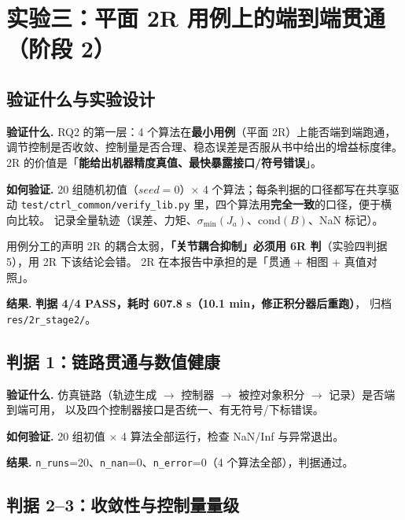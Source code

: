 \documentclass[11pt,a4paper]{ctexart}
\begin{document}
\section{实验三：平面 2R 用例上的端到端贯通（阶段 2）}\label{sec:exp3}

\subsection{验证什么与实验设计}

\textbf{验证什么.} RQ2 的第一层：4 个算法在\textbf{最小用例}（平面 2R）上能否端到端跑通，
调节控制是否收敛、控制量是否合理、稳态误差是否服从书中给出的增益标度律。
2R 的价值是「\textbf{能给出机器精度真值、最快暴露接口/符号错误}」。

\textbf{如何验证.} 20 组随机初值（$seed=0$）$\times$ 4 个算法；每条判据的口径都写在共享驱动
\texttt{test/ctrl\_common/verify\_lib.py} 里，四个算法用\textbf{完全一致}的口径，便于横向比较。
记录全量轨迹（误差、力矩、$\sigma_{\min}(J_a)$、$\mathrm{cond}(B)$、NaN 标记）。

\begin{warnbox}{用例分工的声明}
2R 的耦合太弱，\textbf{「关节耦合抑制」必须用 6R 判}（实验四判据 5），用 2R 下该结论会错。
2R 在本报告中承担的是「贯通 + 相图 + 真值对照」。
\end{warnbox}

\textbf{结果.} \textbf{判据 4/4 PASS，耗时 607.8 s（10.1 min，修正积分器后重跑）}，
归档 \texttt{res/2r\_stage2/}。

\subsection{判据 1：链路贯通与数值健康}

\textbf{验证什么.} 仿真链路（轨迹生成 $\to$ 控制器 $\to$ 被控对象积分 $\to$ 记录）是否端到端可用，
以及四个控制器接口是否统一、有无符号/下标错误。

\textbf{如何验证.} 20 组初值 $\times$ 4 算法全部运行，检查 NaN/Inf 与异常退出。

\textbf{结果.} \texttt{n\_runs}=20、\texttt{n\_nan}=0、\texttt{n\_error}=0（4 个算法全部），判据通过。

\subsection{判据 2--3：收敛性与控制量量级}
\end{document}

